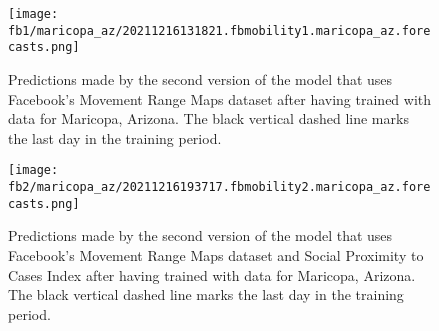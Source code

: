 \begin{figure}[!htb]
    \centering
    \texttt{[image: fb1/maricopa\_az/20211216131821.fbmobility1.maricopa\_az.forecasts.png]}
    \caption{Predictions made by the second version of the model that uses Facebook's Movement Range Maps dataset after having trained with data for Maricopa, Arizona. The black vertical dashed line marks the last day in the training period.}
    \label{fig:predictions-maricopa-fb1}
\end{figure}

\begin{figure}[!htb]
    \centering
    \texttt{[image: fb2/maricopa\_az/20211216193717.fbmobility2.maricopa\_az.forecasts.png]}
    \caption{Predictions made by the second version of the model that uses Facebook's Movement Range Maps dataset and Social Proximity to Cases Index after having trained with data for Maricopa, Arizona. The black vertical dashed line marks the last day in the training period.}
    \label{fig:predictions-maricopa-fb2}
\end{figure}